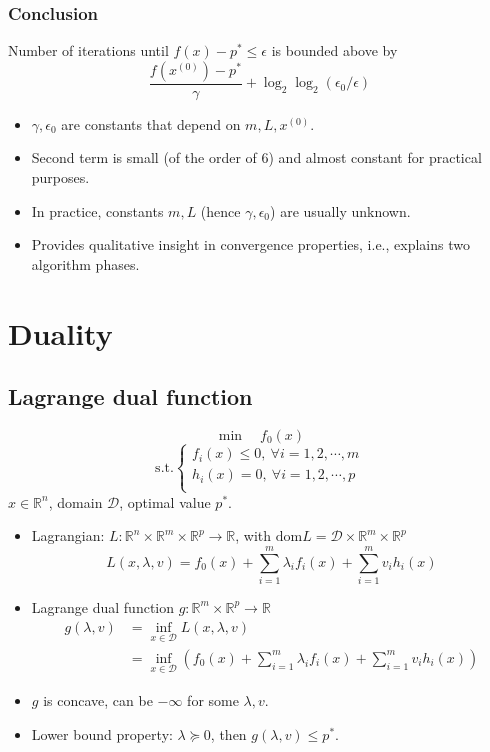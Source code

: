 \subsubsection{Conclusion}
Number of iterations until $f(x) - p^* \le \epsilon$ is bounded above by
$$
\frac{f(x^{(0)}) - p^*}{\gamma} + \log_2\log_2(\epsilon_0/\epsilon)
$$
\begin{itemize}
    \item $\gamma, \epsilon_0$ are constants that depend on $m, L, x^{(0)}$.
    \item Second term is small (of the order of $6$) and almost constant for practical purposes.
    \item In practice, constants $m, L$ (hence $\gamma, \epsilon_0$) are usually unknown.
    \item Provides qualitative insight in convergence properties, i.e., explains two algorithm phases.
\end{itemize}
\pagebreak

\section{Duality}
\subsection{Lagrange dual function}
$$
\min \quad f_0(x)
$$
$$
\text{s.t.} 
\begin{cases}
    f_i(x) \le 0, \ \forall i = 1, 2, \cdots, m \\
    h_i(x) = 0, \ \forall i = 1, 2, \cdots, p \\
\end{cases}
$$
$x \in \mathbb{R}^n$, domain $\mathcal{D}$, optimal value $p^*$. \\
\begin{itemize}
    \item Lagrangian: $L: \mathbb{R}^n \times \mathbb{R}^m \times \mathbb{R}^p \rightarrow \mathbb{R}$, with $\text{dom} L = \mathcal{D} \times \mathbb{R}^m \times \mathbb{R}^p$
    $$
    L(x, \lambda, v) = f_0(x) + \sum_{i = 1}^m \lambda_if_i(x) + \sum_{i = 1}^m v_ih_i(x)
    $$
    \item Lagrange dual function $g: \mathbb{R}^m \times \mathbb{R}^p \rightarrow \mathbb{R}$
    \begin{align}
        g(\lambda, v) & = \inf_{x \in \mathcal{D}} L(x, \lambda, v) \nonumber \\
        & = \inf_{x \in \mathcal{D}} (f_0(x) + \sum_{i = 1}^m \lambda_if_i(x) + \sum_{i = 1}^m v_ih_i(x)) \nonumber
    \end{align}
    \item $g$ is concave, can be $- \infty$ for some $\lambda, v$.
    \item Lower bound property: $\lambda \succcurlyeq 0$, then $g(\lambda, v) \le p^*$.
\end{itemize}

